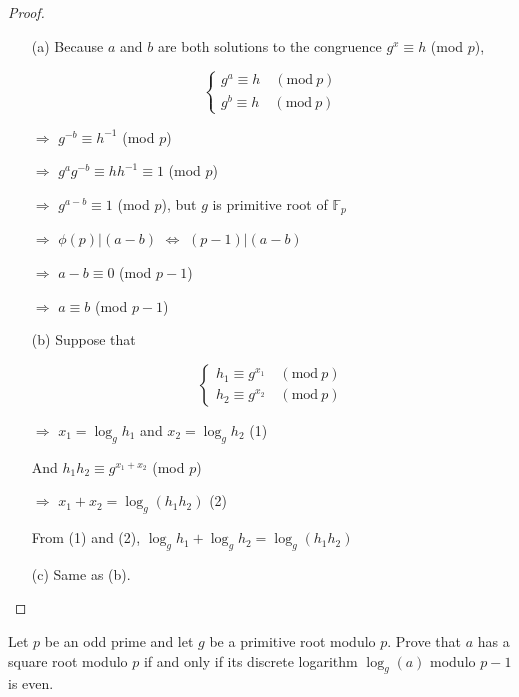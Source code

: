 \begin{proof}
\begin{enumerate}[itemsep=0pt]
    \item [(a)] Because $a$ and $b$ are both solutions to the congruence $g^x \equiv h$ (mod $p$),

    \begin{equation*}
        \begin{cases}
        g^a \equiv h \quad (\text{mod}\ p) \\
        g^b \equiv h \quad (\text{mod}\ p)
        \end{cases}
    \end{equation*}


    $\Rightarrow$ $g^{-b} \equiv h^{-1}$ (mod $p$)
    
    $\Rightarrow$ $g^ag^{-b} \equiv hh^{-1} \equiv 1$ (mod $p$)
    
    $\Rightarrow$ $g^{a-b} \equiv 1$ (mod $p$), but $g$ is primitive root of $\mathbb{F}_p$
    
    $\Rightarrow$ $\phi(p) | (a-b)$ $\Leftrightarrow$ $(p-1) | (a-b)$
    
    $\Rightarrow$ $a - b \equiv 0$ (mod $p-1$)
    
    $\Rightarrow$ $a \equiv b$ (mod $p-1$)

    \item[(b)] Suppose that 
    
    \begin{equation*}
        \begin{cases}
        h_1 \equiv g^{x_1} \quad (\text{mod}\ p) \\
        h_2 \equiv g^{x_2} \quad (\text{mod}\ p)
        \end{cases}
    \end{equation*}
    
    $\Rightarrow$ $x_1=\log_g h_1$ and $x_2=\log_g h_2$ (1)
    
    And $h_1 h_2 \equiv g^{x_1 + x_2}$ (mod $p$)
    
    $\Rightarrow$ $x_1 + x_2 = \log_g(h_1 h_2)$ (2)
    
    From (1) and (2), $\log_g h_1 + \log_g h_2 = \log_g (h_1 h_2)$
    
    \item[(c)] Same as (b).
\end{enumerate}

\end{proof}

\begin{exer}[2.5]
Let $p$ be an odd prime and let $g$ be a primitive root modulo $p$. Prove that $a$ has a square root modulo $p$ if and only if its discrete logarithm $\log_g(a)$ modulo $p-1$ is even. 
\end{exer}

